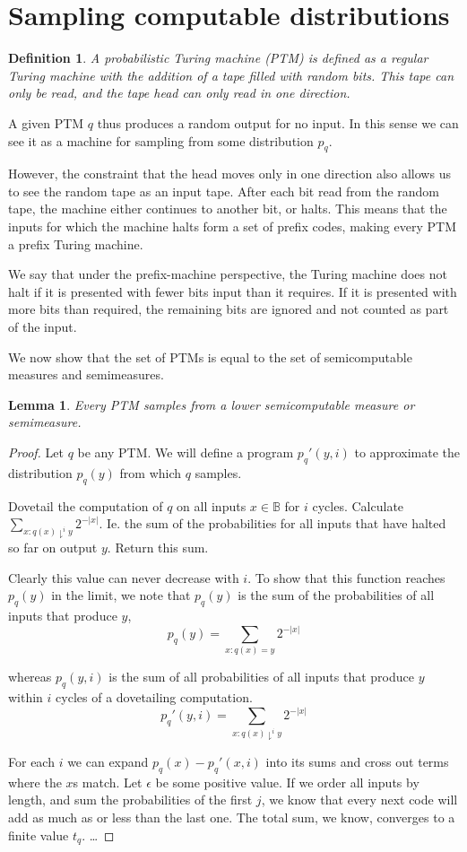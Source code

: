 \documentclass[10pt,a4paper,oneside]{article}
\newtheorem{lma}{Lemma}
\newtheorem{dfn}{Definition}
\begin{document}
\section*{Sampling computable distributions}

\begin{dfn}
A \emph{probabilistic Turing machine} (PTM) is defined as a regular Turing machine with the addition of a tape filled with random bits. This tape can only be read, and the tape head can only read in one direction.
\end{dfn}

A given PTM $q$ thus produces a random output for no input. In this sense we can see it as a machine for sampling from some distribution $p_q$. 

However, the constraint that the head moves only in one direction also allows us to see the random tape as an input tape. After each bit read from the random tape, the machine either continues to another bit, or halts. This means that the inputs for which the machine halts form a set of prefix codes, making every PTM a prefix Turing machine.

We say that under the prefix-machine perspective, the Turing machine does not halt if it is presented with fewer bits input than it requires. If it is presented with more bits than required, the remaining bits are ignored and not counted as part of the input.

We now show that the set of PTMs is equal to the set of semicomputable measures and semimeasures.

\begin{lma}
Every PTM samples from a lower semicomputable measure or semimeasure.
\end{lma}
\begin{proof}
Let $q$ be any PTM. We will define a program $p_q'(y, i)$ to approximate the distribution $p_q(y)$ from which $q$ samples. 

Dovetail the computation of $q$ on all inputs $x \in \mathbb B$ for $i$ cycles. Calculate $\sum_{x : q(x) \downharpoonright^i y}2^{-|x|}$. Ie. the sum of the probabilities for all inputs that have halted so far on output $y$. Return this sum.

Clearly this value can never decrease with $i$. To show that this function reaches $p_q(y)$ in the limit, we note that $p_q(y)$ is the sum of the probabilities of all inputs that produce $y$,
\[
p_q(y) = \sum_{x : q(x) = y} 2^{-|x|}
\] 

whereas $p_q(y, i)$ is the sum of all probabilities of all inputs that produce $y$ within $i$ cycles of a dovetailing computation.
\[
p_q'(y, i) = \sum_{x : q(x) \downharpoonright^i y} 2^{-|x|}
\]

For each $i$ we can expand $p_q(x) - p_q'(x, i)$ into its sums and cross out terms where the $x$s match. Let $\epsilon$ be some positive value. If we order all inputs by length, and sum the probabilities of the first $j$, we know that every next code will add as much as or less than the last one. The total sum, we know, converges to a finite value $t_q$. \ldots
 
\end{proof}
\end{document}
